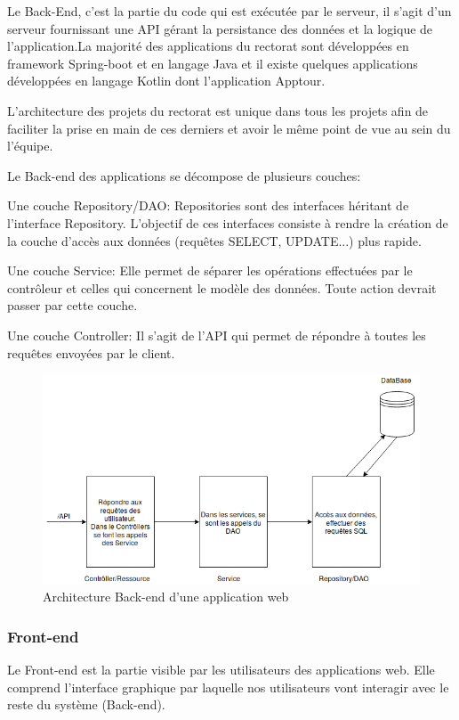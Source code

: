 \documentclass[12pt]{article}
\begin{document}
Le Back-End, c’est la partie du code qui est exécutée par le serveur, il s’agit d'un serveur fournissant une API gérant la persistance des données et la logique de l'application.La majorité des applications du rectorat sont développées en framework Spring-boot et en langage Java et il existe quelques applications développées en langage Kotlin dont l'application Apptour.

L'architecture des projets du rectorat est unique dans tous les projets afin  de faciliter la prise en main de ces derniers et avoir le même point de vue au sein du l'équipe.

Le Back-end des applications se décompose de plusieurs couches: \newline

Une couche Repository/DAO: Repositories sont des interfaces héritant de l'interface Repository. L'objectif de ces interfaces consiste à rendre la création de la couche d'accès aux données (requêtes SELECT, UPDATE...) plus rapide.\newline


Une couche Service: Elle permet de séparer les opérations effectuées par le contrôleur et celles qui concernent le modèle des données. Toute action devrait passer par cette couche.\newline


Une couche Controller: Il s'agit de l'API qui permet de répondre à toutes les requêtes envoyées par le client.

\begin{figure}[H]
	\centering
 		\includegraphics[width=1\textwidth]{diagrammes/ArchitectureProjet.png}
  		\caption{Architecture Back-end d'une application web}
	\end{figure}

\subsubsection{Front-end}
Le Front-end est la partie visible par les utilisateurs des applications web. Elle comprend l'interface graphique par laquelle nos utilisateurs vont interagir avec
le reste du système (Back-end).
\end{document}

